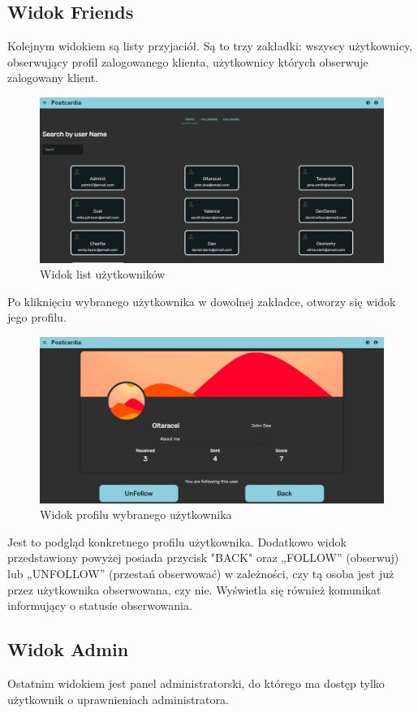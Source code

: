 \documentclass[a4paper,twoside,12pt]{book}
\begin{document}
\subsection{Widok Friends}
Kolejnym widokiem są listy przyjaciół. Są to trzy zakładki: wszyscy użytkownicy, obserwujący profil zalogowanego klienta, użytkownicy których obserwuje zalogowany klient.
\begin{figure}[H]
    \centering
    \includegraphics[width=1\textwidth]{webowka_ss/friends.png}
    \caption{Widok list użytkowników}
\end{figure}
Po kliknięciu wybranego użytkownika w dowolnej zakładce, otworzy się widok jego profilu.
\begin{figure}[H]
    \centering
    \includegraphics[width=1\textwidth]{webowka_ss/friend_profile.png}
    \caption{Widok profilu wybranego użytkownika}
\end{figure}
Jest to podgląd konkretnego profilu użytkownika. Dodatkowo widok przedstawiony powyżej posiada przycisk "BACK" oraz „FOLLOW” (obserwuj) lub „UNFOLLOW” (przestań obserwować) w zależności, czy tą osoba jest już przez użytkownika obserwowana, czy nie. Wyświetla się również komunikat informujący o statusie obserwowania.
\subsection{Widok Admin}
Ostatnim widokiem jest panel administratorski, do którego ma dostęp tylko użytkownik o uprawnieniach administratora.
\end{document}
